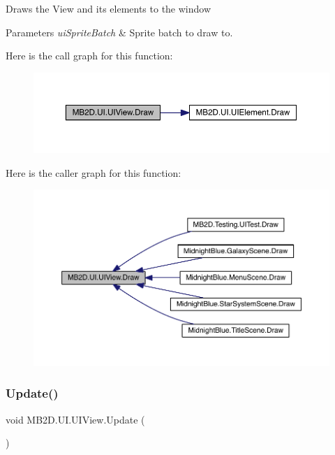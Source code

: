 Draws the View and its elements to the window 


\begin{DoxyParams}{Parameters}
{\em ui\+Sprite\+Batch} & Sprite batch to draw to.\\
\hline
\end{DoxyParams}
Here is the call graph for this function\+:
\nopagebreak
\begin{figure}[H]
\begin{center}
\leavevmode
\includegraphics[width=350pt]{class_m_b2_d_1_1_u_i_1_1_u_i_view_a1f1acf013f17aa0738ff2d9b0516126e_cgraph}
\end{center}
\end{figure}
Here is the caller graph for this function\+:
\nopagebreak
\begin{figure}[H]
\begin{center}
\leavevmode
\includegraphics[width=350pt]{class_m_b2_d_1_1_u_i_1_1_u_i_view_a1f1acf013f17aa0738ff2d9b0516126e_icgraph}
\end{center}
\end{figure}
\hypertarget{class_m_b2_d_1_1_u_i_1_1_u_i_view_a5628b6cd853a0f419eb8ac62958f62bb}{}\label{class_m_b2_d_1_1_u_i_1_1_u_i_view_a5628b6cd853a0f419eb8ac62958f62bb} 
\subsubsection{\texorpdfstring{Update()}{Update()}}
{\footnotesize\ttfamily void M\+B2\+D.\+U\+I.\+U\+I\+View.\+Update (\begin{DoxyParamCaption}{ }\end{DoxyParamCaption})\hspace{0.3cm}{\ttfamily [inline]}}



